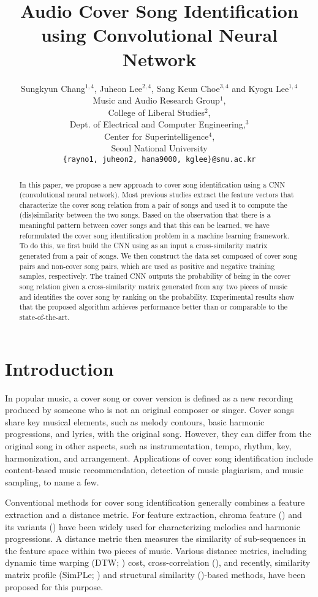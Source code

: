 \documentclass{article}
\title{Audio Cover Song Identification using Convolutional Neural Network}
\author{
  Sungkyun Chang$^{1,4}$, Juheon Lee$^{2,4}$, Sang Keun Choe$^{3,4}$ and Kyogu Lee$^{1,4}$  \\
  Music and Audio Research Group$^1$,\\ College of Liberal Studies$^2$,\\ Dept. of Electrical and Computer Engineering,$^3$\\
  Center for Superintelligence$^4$,\\
  Seoul National University\\
  \texttt{\{rayno1, juheon2, hana9000, kglee\}@snu.ac.kr} \\
}
\begin{document}

\maketitle

\begin{abstract}
In this paper, we propose a new approach to cover song identification using a CNN (convolutional neural network). Most previous studies extract the feature vectors that characterize the cover song relation from a pair of songs and used it to compute the (dis)similarity between the two songs. Based on the observation that there is a meaningful pattern between cover songs and that this can be learned, we have reformulated the cover song identification problem in a machine learning framework. To do this, we first build the CNN using as an input a cross-similarity matrix generated from a pair of songs. We then construct the data set composed of cover song pairs and non-cover song pairs, which are used as positive and negative training samples, respectively. The trained CNN outputs the probability of being in the cover song relation given a cross-similarity matrix generated from any two pieces of music and identifies the cover song by ranking on the probability. Experimental results show that the proposed algorithm achieves performance better than or comparable to the state-of-the-art.
\end{abstract}

\section{Introduction}
\label{intro}
In popular music, a cover song or cover version is defined as a new recording produced by someone who is not an original composer or singer. Cover songs share key musical elements, such as melody contours, basic harmonic progressions, and lyrics, with the original song. However, they can differ from the original song in other aspects, such as instrumentation, tempo, rhythm, key, harmonization, and arrangement. Applications of cover song identification include content-based music recommendation, detection of music plagiarism, and music sampling, to name a few. 

Conventional methods for cover song identification generally combines a feature extraction and a distance metric. For feature extraction,  chroma feature (\citet{serra2009cross}) and its variants (\citet{muller2006towards,muller2010towards}) have been widely used for characterizing melodies and harmonic progressions. A distance metric then measures the similarity of sub-sequences in the feature space within two pieces of music. Various distance metrics, including dynamic time warping (DTW; \citet{serra2008chroma}) cost, cross-correlation (\citet{ellis20072007}), and recently, similarity matrix profile (SimPLe; \citet{silva2016simple}) and structural similarity (\citet{cai2017cross})-based methods, have been proposed for this purpose. 
\end{document}
